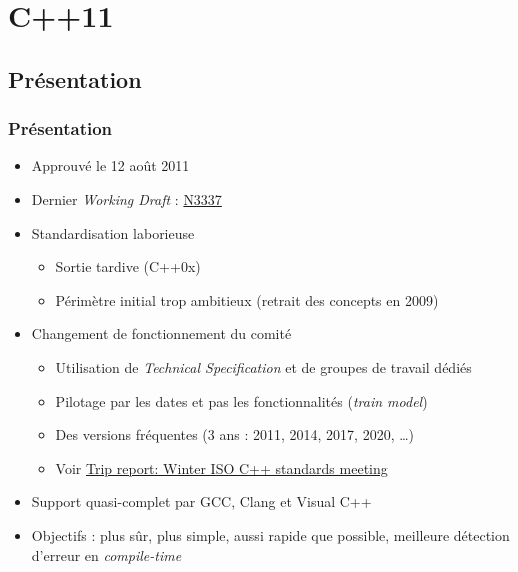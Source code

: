\documentclass[C++.tex]{subfiles}
\begin{document}
\section{C++11}
\subsection*{Présentation}
\begin{frame}
	\frametitle{Présentation}
	\begin{itemize}
		\item Approuvé le 12 août 2011
		\item Dernier \textit{Working Draft} : \href{http://www.open-std.org/jtc1/sc22/wg21/docs/papers/2012/n3337.pdf}{N3337}
	
	
		\item Standardisation laborieuse
		\begin{itemize}
			\item Sortie tardive (C++0x)
			\item Périmètre initial trop ambitieux (retrait des concepts en 2009)
		\end{itemize}
		\item Changement de fonctionnement du comité
		\begin{itemize}
			\item Utilisation de \textit{Technical Specification} et de groupes de travail dédiés
			\item Pilotage par les dates et pas les fonctionnalités (\textit{train model})
			\item Des versions fréquentes (3 ans : 2011, 2014, 2017, 2020, \ldots)
			\item Voir \href{https://herbsutter.com/2016/03/11/trip-report-winter-iso-c-standards-meeting/}{Trip report: Winter ISO C++ standards meeting}
		\end{itemize}
		\item Support quasi-complet par GCC, Clang et Visual C++


		\item Objectifs : plus sûr, plus simple, aussi rapide que possible, meilleure détection d'erreur en \textit{compile-time}

	\end{itemize}
\end{frame}
\end{document}
